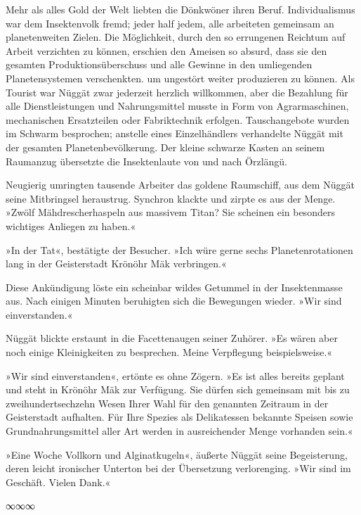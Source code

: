 Mehr als alles Gold der Welt liebten die Dönkwöner ihren Beruf. Individualismus war dem Insektenvolk fremd; jeder half jedem, alle arbeiteten gemeinsam an planetenweiten Zielen. Die Möglichkeit, durch den so errungenen Reichtum auf Arbeit verzichten zu können, erschien den Ameisen so absurd, dass sie den gesamten Produktionsüberschuss und alle Gewinne in den umliegenden Planetensystemen verschenkten. um ungestört weiter produzieren zu können. Als Tourist war Nüggät zwar jederzeit herzlich willkommen, aber die Bezahlung für alle Dienstleistungen und Nahrungsmittel musste in Form von Agrarmaschinen, mechanischen Ersatzteilen oder Fabriktechnik erfolgen. Tauschangebote wurden im Schwarm besprochen; anstelle eines Einzelhändlers verhandelte Nüggät mit der gesamten Planetenbevölkerung. Der kleine schwarze Kasten an seinem Raumanzug übersetzte die Insektenlaute von und nach Örzlängü.

Neugierig umringten tausende Arbeiter das goldene Raumschiff, aus dem Nüggät seine Mitbringsel heraustrug. Synchron klackte und zirpte es aus der Menge. »Zwölf Mähdrescherhaspeln aus massivem Titan? Sie scheinen ein besonders wichtiges Anliegen zu haben.«

»In der Tat«, bestätigte der Besucher. »Ich würe gerne sechs Planetenrotationen lang in der Geisterstadt Krönöhr Mäk verbringen.«

Diese Ankündigung löste ein scheinbar wildes Getummel in der Insektenmasse aus. Nach einigen Minuten beruhigten sich die Bewegungen wieder. »Wir sind einverstanden.«

Nüggät blickte erstaunt in die Facettenaugen seiner Zuhörer. »Es wären aber noch einige Kleinigkeiten zu besprechen. Meine Verpflegung beispielsweise.«

»Wir sind einverstanden«, ertönte es ohne Zögern. »Es ist alles bereits geplant und steht in Krönöhr Mäk zur Verfügung. Sie dürfen sich gemeinsam mit bis zu zweihundertsechzehn Wesen Ihrer Wahl für den genannten Zeitraum in der Geisterstadt aufhalten. Für Ihre Spezies als Delikatessen bekannte Speisen sowie Grundnahrungsmittel aller Art werden in ausreichender Menge vorhanden sein.«

»Eine Woche Vollkorn und Alginatkugeln«, äußerte Nüggät seine Begeisterung, deren leicht ironischer Unterton bei der Übersetzung verlorenging. »Wir sind im Geschäft. Vielen Dank.«

\begin{center}
∞∞∞
\end{center}

